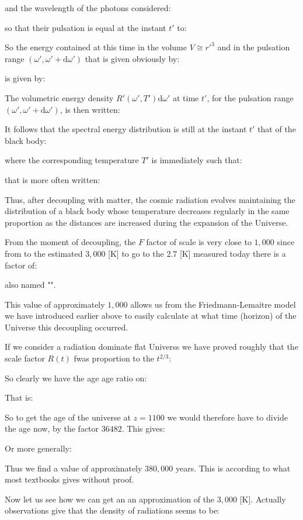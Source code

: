 	and the wavelength of the photons considered:
	
	so that their pulsation is equal at the instant $t'$ to:
	
	So the energy contained at this time in the volume $V\cong {r'}^3$ and in the pulsation range $(\omega',\omega'+\mathrm{d}\omega')$ that is given obviously by:
	
	is given by:
	
	The volumetric energy density $R'(\omega',T')\mathrm{d}\omega'$ at time $t'$, for the pulsation range $(\omega',\omega'+\mathrm{d}\omega')$, is then written:
	
	It follows that the spectral energy distribution is still at the instant $t'$ that of the black body:
	
	where the corresponding temperature $T'$ is immediately such that:
	
	that is more often written:
	
	Thus, after decoupling with matter, the cosmic radiation evolves maintaining the distribution of a black body whose temperature decreases regularly in the same proportion as the distances are increased during the expansion of the Universe.

	From the moment of decoupling, the $F$ factor of scale is very close to $1,000$ since from to the estimated $3,000$ [K] to go to the $2.7$ [K] measured today there is a factor of:
	
	also named "".
	
	 This value of approximately $1,000$ allows us from the Friedmann-Lemaitre model we have introduced earlier above to easily calculate at what time (horizon) of the Universe this decoupling occurred.
	 
	 If we consider a radiation dominate flat Universs we have proved roughly that the scale factor $R(t)$ fwas proportion to the $t^{2/3}$:
	
	So clearly we have the age age ratio on:
	
	That is:
	
	So to get the age of the universe at $z=1100$ we would therefore have to divide the age now, by the factor $36482$. This gives:
	
	Or more generally:
	
	 Thus we find a value of approximately $380,000$ years. This is according to what most textbooks gives without proof.
	 
	 Now let us see how we can get an an approximation of the $3,000$ [K]. Actually observations give that the density of radiations seems to be:
	
